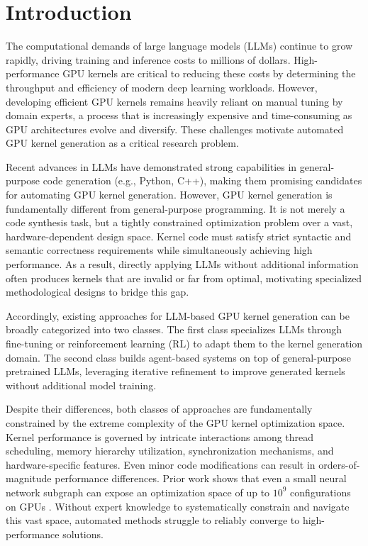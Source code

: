 \section{Introduction}
The computational demands of large language models (LLMs) continue to grow rapidly, driving training and inference costs to millions of dollars. High-performance GPU kernels are critical to reducing these costs by determining the throughput and efficiency of modern deep learning workloads. However, developing efficient GPU kernels remains heavily reliant on manual tuning by domain experts, a process that is increasingly expensive and time-consuming as GPU architectures evolve and diversify. These challenges motivate automated GPU kernel generation as a critical research problem.

Recent advances in LLMs have demonstrated strong capabilities in general-purpose code generation (e.g., Python, C++), making them promising candidates for automating GPU kernel generation. However, GPU kernel generation is fundamentally different from general-purpose programming. It is not merely a code synthesis task, but a tightly constrained optimization problem over a vast, hardware-dependent design space. Kernel code must satisfy strict syntactic and semantic correctness requirements while simultaneously achieving high performance. As a result, directly applying LLMs without additional information often produces kernels that are invalid or far from optimal, motivating specialized methodological designs to bridge this gap.

Accordingly, existing approaches for LLM-based GPU kernel generation can be broadly categorized into two classes. The first class specializes LLMs through fine-tuning or reinforcement learning (RL) to adapt them to the kernel generation domain. The second class builds agent-based systems on top of general-purpose pretrained LLMs, leveraging iterative refinement to improve generated kernels without additional model training.

Despite their differences, both classes of approaches are fundamentally constrained by the extreme complexity of the GPU kernel optimization space. Kernel performance is governed by intricate interactions among thread scheduling, memory hierarchy utilization, synchronization mechanisms, and hardware-specific features. Even minor code modifications can result in orders-of-magnitude performance differences. Prior work shows that even a small neural network subgraph can expose an optimization space of up to $10^9$
 configurations on GPUs . Without expert knowledge to systematically constrain and navigate this vast space, automated methods struggle to reliably converge to high-performance solutions.


